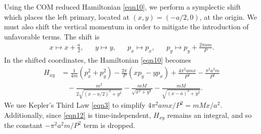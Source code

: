 \documentclass[12pt]{article}
\begin{document}
Using the COM reduced Hamiltonian \eqref{eqn10}, we perform a symplectic shift which places the left primary, located at $(x,y) = (-a/2, 0)$, at the origin. We must also shift the vertical momentum in order to mitigate the introduction of unfavorable terms. The shift is
\begin{align}
x \mapsto x + \frac{a}{2}, & & y \mapsto y, & & p_x \mapsto p_x, & & p_y \mapsto p_y + \frac{2\pi am}{P}.
\label{eqn11}
\end{align}
In the shifted coordinates, the Hamiltonian \eqref{eqn10} becomes
\begin{align}
H_{xy} & = \frac{1}{4m}\left(p_x^2 + p_y^2\right) - \frac{2\pi}{P}\left(xp_y - yp_x\right) + \frac{4\pi^2 amx}{P^2} - \frac{\pi^2a^2m}{P^2}  \nonumber\\
& \ \ \ \ - \frac{m^2}{2\sqrt{(x-a/2)^2 + y^2}} - \frac{mM}{\sqrt{x^2+y^2}} - \frac{mM}{\sqrt{(x-a)^2 + y^2}}.
\label{eqn12}
\end{align}
We use Kepler's Third Law \eqref{eqn3} to simplify $4\pi^2 amx/P^2 = mMx/a^2$. Additionally, since \eqref{eqn12} is time-independent, $H_{xy}$ remains an integral, and so the constant $-\pi^2a^2m/P^2$ term is dropped. 
\end{document}
